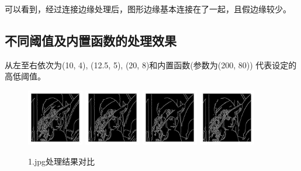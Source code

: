 \documentclass{article}
\begin{document}
    可以看到，经过连接边缘处理后，图形边缘基本连接在了一起，且假边缘较少。

\subsection{不同阈值及内置函数的处理效果}

    从左至右依次为(10, 4), (12.5, 5), (20, 8)和内置函数(参数为(200, 80))
    代表设定的高低阈值。

\begin{figure}[h]
    \centering
    \includegraphics[width=0.22\textwidth]{./result/1_10_4}
    \includegraphics[width=0.22\textwidth]{./result/1_125_5}
    \includegraphics[width=0.22\textwidth]{./result/1_20_8}
    \includegraphics[width=0.22\textwidth]{./result/1_standard}
    \caption{1.jpg处理结果对比}
\end{figure}
\end{document}
